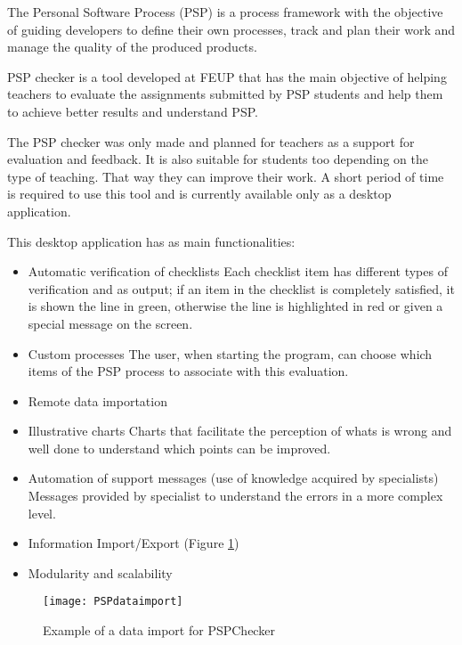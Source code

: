 The Personal Software Process (PSP) \citep{humphrey2005psp} is a process framework with the objective of guiding developers to define their own processes, track and plan their work and manage the quality of the produced products.

PSP checker \citep{Pinto2010} is a tool developed at FEUP that has the main objective of helping teachers to evaluate the assignments submitted by PSP students  and help them to achieve better results and understand PSP.

The PSP checker was only made and planned for teachers as a support for evaluation and feedback. It is also suitable for students too depending on the type of teaching. That way they can improve their work. A short period of time is required to use this tool and is currently available only as a desktop application.


This desktop application has as main functionalities:
\begin{itemize}
	\item Automatic verification of checklists
	\subitem Each checklist item has different types of verification and as output; if an item in the checklist is completely satisfied, it is shown the line in green, otherwise the line is highlighted in red or given a special message on the screen.
	\item Custom processes
	\subitem The user, when starting the program, can choose which items of the PSP process to associate with this evaluation.
	\item Remote data importation
	\item Illustrative charts
	\subitem Charts that facilitate the perception of whats is wrong and well done to understand which points can be improved.
	\item Automation of support messages (use of knowledge acquired by specialists)
	\subitem Messages provided by specialist to understand the errors in a more complex level.
	\item Information Import/Export (Figure \ref{fig:PSPdataimport})
	\item Modularity and scalability
\end{itemize}

\begin{figure}[h]
	\begin{center}
		\leavevmode
		\texttt{[image: PSPdataimport]}
		\caption{Example of a data import for PSPChecker}
		\label{fig:PSPdataimport}
	\end{center}
\end{figure}


